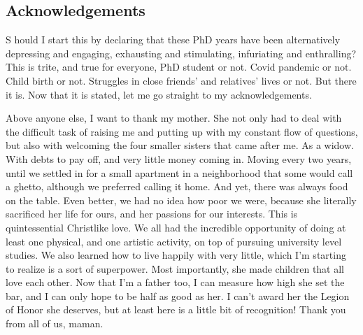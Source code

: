 
{}

\vspace*{-1.6cm}
\begin{flushright}
\section*{\fontsize{20pt}{20pt}\selectfont\textnormal{Acknowledgements}}
\end{flushright}
\vspace{-0.2cm}


\chead[\fancyplain{}{}]
      {\fancyplain{}{}}
\lfoot[\fancyplain{}{}]
      {\fancyplain{}{}}
\cfoot[\fancyplain{}{\thepage}]
      {\fancyplain{}{\thepage}}
\rfoot[\fancyplain{}{}]%
     {\fancyplain{}{\scriptsize}}


\lettrine[lines=1]{S}{ } hould I start this by declaring that these PhD years have been alternatively depressing and engaging, exhausting and stimulating, infuriating and enthralling? This is trite, and true for everyone, PhD student or not. Covid pandemic or not. Child birth or not. Struggles in close friends' and relatives' lives or not. But there it is. Now that it is stated, let me go straight to my acknowledgements.

Above anyone else, I want to thank my mother. She not only had to deal with the difficult task of raising me and putting up with my constant flow of questions, but also with welcoming the four smaller sisters that came after me. As a widow. With debts to pay off, and very little money coming in. Moving every two years, until we settled in for a small apartment in a neighborhood that some would call a ghetto, although we preferred calling it home. And yet, there was always food on the table. Even better, we had no idea how poor we were, because she literally sacrificed her life for ours, and her passions for our interests. This is quintessential Christlike love. We all had the incredible opportunity of doing at least one physical, and one artistic activity, on top of pursuing university level studies. We also learned how to live happily with very little, which I'm starting to realize is a sort of superpower. Most importantly, she made children that all love each other. Now that I'm a father too, I can measure how high she set the bar, and I can only hope to be half as good as her. I can't award her the Legion of Honor she deserves, but at least here is a little bit of recognition! Thank you from all of us, maman.

